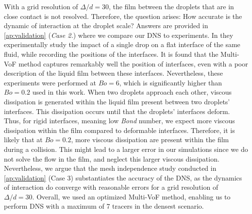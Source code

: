 With a grid resolution of $\Delta/d = 30$, the film between the droplets that are in close contact is not resolved. 
Therefore, the question arises: How accurate is the dynamic of interaction at the droplet scale?
Answers are  provided in \ref{ap:validation} (\textit{Case 2.}) where we compare our DNS to \citet{mohamed2003drop} experiments.
In \citet{mohamed2003drop} they experimentally study the impact of a single drop on a flat interface of the same fluid, while recording the positions of the interfaces.
It is found that the Multi-VoF method captures remarkably well the position of interfaces, even with a poor description of the liquid film between these interfaces.
Nevertheless, these experiments were performed at $Bo = 6$, which is significantly higher than $Bo=0.2$ used in this work. 
When two droplets approach each other, viscous dissipation is generated within the liquid film present between two droplets' interfaces.
This dissipation occurs until that the droplets' interfaces deform.
Thus, for rigid interfaces, meaning low \textit{Bond} number, we expect more viscous dissipation within the film compared to deformable interfaces. 
Therefore, it is likely that at $Bo = 0.2$, more viscous dissipation are present within the film during a collision.
This might lead to a larger error in our simulations since we do not solve the flow in the film, and neglect this larger viscous dissipation.
Nevertheless, we argue that the mesh independence study conducted in \ref{ap:validation} (Case 3) substantiates the accuracy of the DNS, as the dynamics of interaction do converge with  reasonable errors for a grid resolution of $\Delta/d = 30$.
Overall, we used an optimized Multi-VoF method, enabling us to perform DNS with a maximum of 7 tracers in the densest scenario.
 





